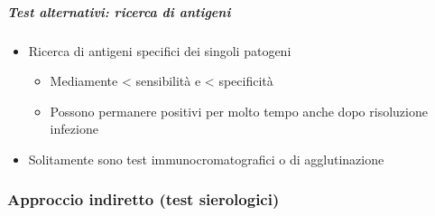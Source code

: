 \documentclass[italian,]{article}
\providecommand{\tightlist}{%
  \setlength{\itemsep}{0pt}\setlength{\parskip}{0pt}}
\begin{document}
\hypertarget{test-alternativi-ricerca-di-antigeni}{%
\subparagraph{Test alternativi: ricerca di
antigeni}\label{test-alternativi-ricerca-di-antigeni}}

\begin{itemize}
\tightlist
\item
  Ricerca di antigeni specifici dei singoli patogeni

  \begin{itemize}
  \tightlist
  \item
    Mediamente \textless{} sensibilità e \textless{} specificità
  \item
    Possono permanere positivi per molto tempo anche dopo risoluzione
    infezione
  \end{itemize}
\item
  Solitamente sono test immunocromatografici o di agglutinazione
\end{itemize}

\hypertarget{approccio-indiretto-test-sierologici}{%
\subsubsection{Approccio indiretto (test
sierologici)}\label{approccio-indiretto-test-sierologici}}
\end{document}
